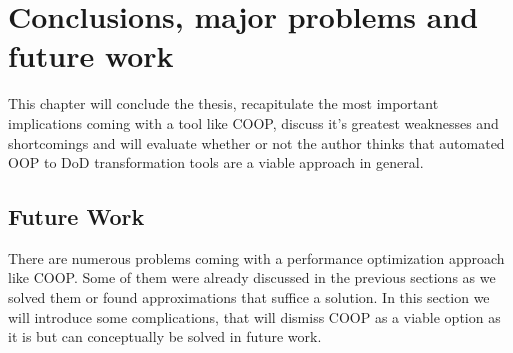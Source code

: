 \chapter{Conclusions, major problems and future work}
This chapter will conclude the thesis, recapitulate the most important implications coming with a tool like COOP, discuss it's greatest weaknesses and shortcomings and will evaluate whether or not the author thinks that automated OOP to DoD transformation tools are a viable approach in general.

\section{Future Work}
There are numerous problems coming with a performance optimization approach like COOP. Some of them were already discussed in the previous sections as we solved them or found approximations that suffice a solution. In this section we will introduce some complications, that will dismiss COOP as a viable option as it is but can conceptually be solved in future work.
